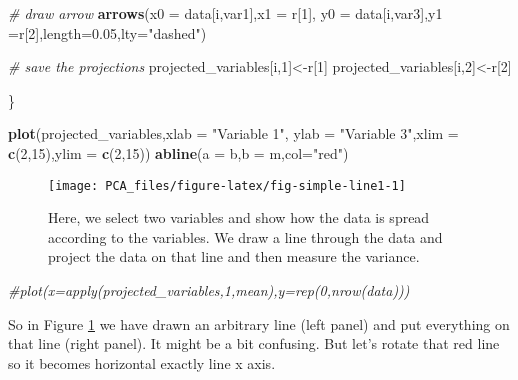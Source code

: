 \documentclass[
]{book}
\newenvironment{Shaded}{\begin{snugshade}}{\end{snugshade}}
\newcommand{\CommentTok}[1]{\textcolor[rgb]{0.56,0.35,0.01}{\textit{#1}}}
\newcommand{\DataTypeTok}[1]{\textcolor[rgb]{0.13,0.29,0.53}{#1}}
\newcommand{\DecValTok}[1]{\textcolor[rgb]{0.00,0.00,0.81}{#1}}
\newcommand{\FloatTok}[1]{\textcolor[rgb]{0.00,0.00,0.81}{#1}}
\newcommand{\KeywordTok}[1]{\textcolor[rgb]{0.13,0.29,0.53}{\textbf{#1}}}
\newcommand{\NormalTok}[1]{#1}
\newcommand{\StringTok}[1]{\textcolor[rgb]{0.31,0.60,0.02}{#1}}
\theoremstyle{definition}
\theoremstyle{definition}
\theoremstyle{definition}
\theoremstyle{remark}
\begin{document}
\begin{Shaded}
\begin{Highlighting}[]
\CommentTok{# draw arrow}
  \KeywordTok{arrows}\NormalTok{(}\DataTypeTok{x0 =}\NormalTok{ data[i,var1],}\DataTypeTok{x1 =}\NormalTok{ r[}\DecValTok{1}\NormalTok{],}
           \DataTypeTok{y0 =}\NormalTok{ data[i,var3],}\DataTypeTok{y1 =}\NormalTok{r[}\DecValTok{2}\NormalTok{],}\DataTypeTok{length=}\FloatTok{0.05}\NormalTok{,}\DataTypeTok{lty=}\StringTok{"dashed"}\NormalTok{)}


\CommentTok{# save the projections}
\NormalTok{projected_variables[i,}\DecValTok{1}\NormalTok{]<-r[}\DecValTok{1}\NormalTok{]}
\NormalTok{projected_variables[i,}\DecValTok{2}\NormalTok{]<-r[}\DecValTok{2}\NormalTok{]}

\NormalTok{\}}



\KeywordTok{plot}\NormalTok{(projected_variables,}\DataTypeTok{xlab =} \StringTok{"Variable 1"}\NormalTok{, }\DataTypeTok{ylab =} \StringTok{"Variable 3"}\NormalTok{,}\DataTypeTok{xlim =} \KeywordTok{c}\NormalTok{(}\DecValTok{2}\NormalTok{,}\DecValTok{15}\NormalTok{),}\DataTypeTok{ylim =} \KeywordTok{c}\NormalTok{(}\DecValTok{2}\NormalTok{,}\DecValTok{15}\NormalTok{))}
\KeywordTok{abline}\NormalTok{(}\DataTypeTok{a =}\NormalTok{ b,}\DataTypeTok{b =}\NormalTok{ m,}\DataTypeTok{col=}\StringTok{"red"}\NormalTok{)}
\end{Highlighting}
\end{Shaded}

\begin{figure}

{\centering \texttt{[image: PCA\_files/figure-latex/fig-simple-line1-1]} 

}

\caption{Here, we select two variables and show how the data is spread according to the variables. We draw a line through the data and project the data on that line and then measure the variance.}\label{fig:fig-simple-line1}
\end{figure}

\begin{Shaded}
\begin{Highlighting}[]
\CommentTok{#plot(x=apply(projected_variables,1,mean),y=rep(0,nrow(data)))}
\end{Highlighting}
\end{Shaded}

So in Figure \ref{fig:fig-simple-line1} we have drawn an arbitrary line (left panel) and put everything on that line (right panel). It might be a bit confusing. But let's rotate that red line so it becomes horizontal exactly line x axis.
\end{document}
